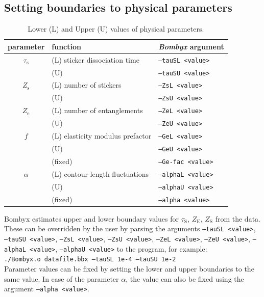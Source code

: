 \documentclass[  superscriptaddress]{revtex4}
\begin{document}
\subsection{Setting boundaries to physical parameters}\label{sec:input:phys}


\begin{table}[h]
\centering
\caption{Lower (L) and Upper (U) values of physical parameters.}
\begin{tabular}{ |c|l|l| } 
 \hline
 parameter & function & \emph{Bombyx} argument \\ 
 \hline
 $\tau_\mathrm{s}$        & (L) sticker dissociation time        & \texttt{--tauSL   <value>} \\
                          & (U)                                  & \texttt{--tauSU   <value>} \\
 $Z_\mathrm{s}$           & (L) number of stickers               & \texttt{--ZsL     <value>} \\ 
                          & (U)                                  & \texttt{--ZsU     <value>} \\
 $Z_\mathrm{e}$           & (L) number of entanglements          & \texttt{--ZeL     <value>} \\ 
                          & (U)                                  & \texttt{--ZeU     <value>} \\
 $f$                      & (L) elasticity modulus prefactor     & \texttt{--GeL     <value>} \\ 
                          & (U)                                  & \texttt{--GeU     <value>} \\
                          & (fixed)                              & \texttt{--Ge-fac  <value>} \\
 $\alpha$                 & (L) contour-length fluctuations      & \texttt{--alphaL  <value>} \\ 
                          & (U)                                  & \texttt{--alphaU  <value>} \\ 
                          & (fixed)                              & \texttt{--alpha   <value>} \\
 \hline
\end{tabular}
\end{table}




Bombyx estimates upper and lower boundary values for $\tau_\mathrm{S}$, $Z_\mathrm{E}$, $Z_\mathrm{S}$ from the data.
These can be overridden by the user by parsing the arguments \texttt{--tauSL <value>},  \texttt{--tauSU <value>}, \texttt{--ZsL <value>},  \texttt{--ZsU <value>}, \texttt{--ZeL <value>},  \texttt{--ZeU <value>}, \texttt{--alphaL <value>},  \texttt{--alphaU <value>} to the program, for example:\\
\texttt{./Bombyx.o datafile.bbx --tauSL 1e-4 --tauSU 1e-2}\\
Parameter values can be fixed by setting the lower and upper boundaries to the same value.
In case of the parameter $\alpha$, the value can also be fixed using the argument \texttt{--alpha <value>}. 
\end{document}
